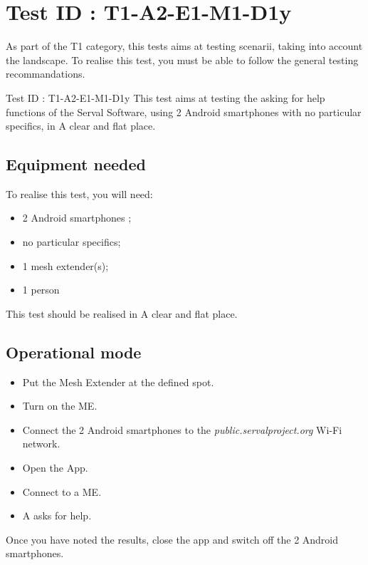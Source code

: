 \documentclass[oneside]{book}
\begin{document}
\section{Test ID : T1-A2-E1-M1-D1y}
\begin{itshape}
As part of the T1 category, this tests aims at testing scenarii, taking into account the landscape. 
To realise this test, you must be able to follow the general testing recommandations.
\end{itshape}
\newline
Test ID : T1-A2-E1-M1-D1y
 This test aims at testing the asking for help functions of the Serval Software, using 2 Android smartphones with no particular specifics, in A clear and flat place.
\subsection{Equipment needed} To realise this test, you will need:
\begin{itemize}
\item 2 Android smartphones ;
\item no particular specifics;
\item 1 mesh extender(s);
\item 1 person
\end{itemize}
This test should be realised in A clear and flat place.
\subsection{Operational mode} \begin{itemize}
\item Put the Mesh Extender at the defined spot.
\item Turn on the ME.
\item Connect the 2 Android smartphones to the \emph{public.servalproject.org} Wi-Fi network.
\item Open the App.
\item Connect to a ME.
\item A asks for help.
\end{itemize}
Once you have noted the results, close the app and switch off the 2 Android smartphones.
\end{document}
